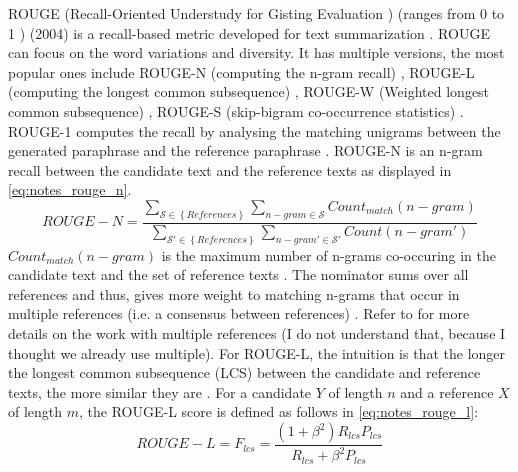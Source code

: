 ROUGE (Recall-Oriented Understudy for Gisting Evaluation \cite{palivela_optimization_2021,lin_rouge_2004}) 
(ranges from 0 to 1 \cite{kurt_pehlivanoglu_comparative_2024}) (2004) 
is a recall-based metric developed for text summarization \cite{zhou_paraphrase_2021,palivela_optimization_2021,kurt_pehlivanoglu_comparative_2024,lin_rouge_2004}.
ROUGE can focus on the word variations and diversity.
It has multiple versions, the most popular ones include 
ROUGE-N (computing the n-gram recall) \cite{zhou_paraphrase_2021,palivela_optimization_2021,kurt_pehlivanoglu_comparative_2024}, 
ROUGE-L (computing the longest common subsequence) \cite{zhou_paraphrase_2021,palivela_optimization_2021,kurt_pehlivanoglu_comparative_2024}, 
ROUGE-W (Weighted longest common subsequence) \cite{palivela_optimization_2021}, 
ROUGE-S (skip-bigram co-occurrence statistics) \cite{palivela_optimization_2021}.
ROUGE-1 computes the recall by analysing the matching unigrams between the generated paraphrase and the reference paraphrase \cite{palivela_optimization_2021,kurt_pehlivanoglu_comparative_2024}.
ROUGE-N is an n-gram recall between the candidate text and the reference texts \cite{lin_rouge_2004} as displayed in \autoref{eq:notes_rouge_n}.
\begin{equation}
    ROUGE-N = \frac{\sum_{\mathcal{S} \in \left\{ References \right\}}\sum_{n-gram \in\mathcal{S}}Count_{match}(n-gram)}{\sum_{\mathcal{S'} \in \left\{ References \right\}}\sum_{n-gram' \in\mathcal{S'}}Count(n-gram')}
\label{eq:notes_rouge_n}
\end{equation}
$Count_{match}(n-gram)$ is the maximum number of n-grams co-occuring in the candidate text and the set of reference texts \cite{lin_rouge_2004}.
The nominator sums over all references and thus, gives more weight to matching n-grams that occur in multiple references (i.e. a consensus between references) \cite{lin_rouge_2004}.
Refer to \citet{lin_rouge_2004} for more details on the work with multiple references (I do not understand that, because I thought we already use multiple).
For ROUGE-L, the intuition is that the longer the longest common subsequence (LCS) between the candidate and reference texts, the more similar they are \cite{lin_rouge_2004}.
For a candidate $Y$ of length $n$ and a reference $X$ of length $m$, the ROUGE-L score is defined as follows in \autoref{eq:notes_rouge_l}:
\begin{equation}
    ROUGE-L = F_{lcs} = \frac{(1 + \beta^2)R_{lcs}P_{lcs}}{R_{lcs} + \beta^2 P_{lcs}}
\label{eq:notes_rouge_l}
\end{equation}
